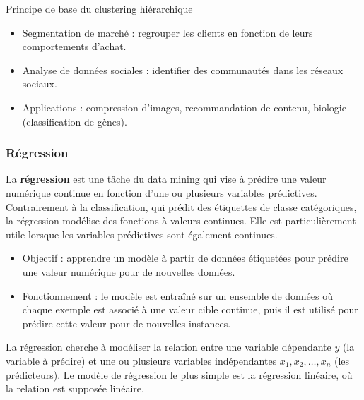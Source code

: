 \documentclass[a4paper,14pt]{article}
\begin{document}
        Principe de base du clustering hiérarchique
        

        
        \begin{itemize}
            \item  Segmentation de marché : regrouper les clients en fonction de leurs comportements d’achat.
            \item  Analyse de données sociales : identifier des communautés dans les réseaux sociaux.
            \item  Applications : compression d’images, recommandation de contenu, biologie (classification de gènes).
        \end{itemize}
        
        
      
      \subsubsection{Régression}

La \textbf{régression} est une tâche du data mining qui vise à prédire une valeur numérique continue en fonction d'une ou plusieurs variables prédictives. Contrairement à la classification, qui prédit des étiquettes de classe catégoriques, la régression modélise des fonctions à valeurs continues. Elle est particulièrement utile lorsque les variables prédictives sont également continues.


\begin{itemize}
    \item  Objectif : apprendre un modèle à partir de données étiquetées pour prédire une valeur numérique pour de nouvelles données.
    \item  Fonctionnement : le modèle est entraîné sur un ensemble de données où chaque exemple est associé à une valeur cible continue, puis il est utilisé pour prédire cette valeur pour de nouvelles instances.
\end{itemize}

La régression cherche à modéliser la relation entre une variable dépendante \( y \) (la variable à prédire) et une ou plusieurs variables indépendantes \( x_1, x_2, \dots, x_n \) (les prédicteurs). Le modèle de régression le plus simple est la régression linéaire, où la relation est supposée linéaire.
\end{document}

